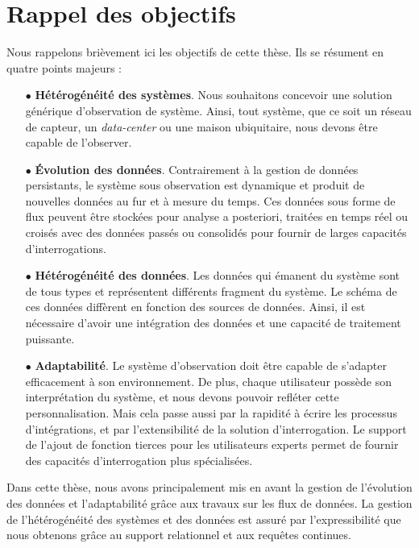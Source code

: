 \section{Rappel des objectifs}\label{sec:conclusion:objectifs}
Nous rappelons brièvement ici les objectifs de cette thèse. Ils se résument en quatre points majeurs :
\begin{itemize}
	\item[$\bullet$] \textbf{Hétérogénéité des systèmes}. Nous souhaitons concevoir une solution générique d'observation de système. Ainsi, tout système, que ce soit un réseau de capteur, un \textit{data-center} ou une maison ubiquitaire, nous devons être capable de l'observer.
	\item[$\bullet$] \textbf{Évolution des données}. Contrairement à la gestion de données persistants, le système sous observation est dynamique et produit de nouvelles données au fur et à mesure du temps. Ces données sous forme de flux peuvent être stockées pour analyse a posteriori, traitées en temps réel ou croisés avec des données passés ou consolidés pour fournir de larges capacités d'interrogations.
	\item[$\bullet$] \textbf{Hétérogénéité des données}. Les données qui émanent du système sont de tous types et représentent différents fragment du système. Le schéma de ces données diffèrent en fonction des sources de données. Ainsi, il est nécessaire d'avoir une intégration des données et une capacité de traitement puissante.
	\item[$\bullet$] \textbf{Adaptabilité}. Le système d'observation doit être capable de s'adapter efficacement à son environnement. De plus, chaque utilisateur possède son interprétation du système, et nous devons pouvoir refléter cette personnalisation. Mais cela passe aussi par la rapidité à écrire les processus d'intégrations, et par l'extensibilité de la solution d'interrogation. Le support de l'ajout de fonction tierces pour les utilisateurs experts permet de fournir des capacités d'interrogation plus spécialisées.
\end{itemize}

Dans cette thèse, nous avons principalement mis en avant la gestion de l'évolution des données et l'adaptabilité grâce aux travaux sur les flux de données. La gestion de l'hétérogénéité des systèmes et des données est assuré par l'expressibilité que nous obtenons grâce au support relationnel et aux requêtes continues.

